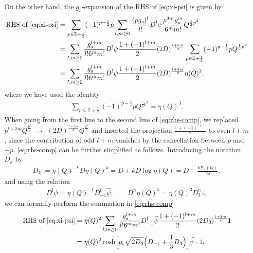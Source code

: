 \documentclass[11pt]{article}
\newcommand{\hf}{\frac{1}{2}}
\def\h#1{\widehat{#1}}
\def\rt#1{\sqrt{#1}}
\renewcommand{\[}{\begin{eqnarray}}
\renewcommand{\]}{\end{eqnarray}}
\begin{document}
On the other hand, the $g_s$-expansion of the RHS of \eqref{eq:xi-psi}
is given by
\begin{align}
 \begin{aligned}
 \text{RHS~of~}\eqref{eq:xi-psi}&=\sum_{p\in\mathbb{Z}+\hf}(-1)^{p-\hf}p
\sum_{l,m\geq0} \frac{(pg_s)^l}{l!}
D^l\psi\frac{p^{3m}g_s^m}{6^m m!}Q^{\hf p^2}\\
&=\sum_{l,m\geq0} \frac{g_s^{l+m}}{l!6^mm!}
D^l\psi\frac{1+(-1)^{l+m}}{2}(2D)^{\frac{l+3m}{2}}\sum_{p\in\mathbb{Z}+\hf}(-1)^{p-\hf}pQ^{\hf p^2}\\
&=\sum_{l,m\geq0} \frac{g_s^{l+m}}{l!6^mm!}
D^l\psi\frac{1+(-1)^{l+m}}{2}(2D)^{\frac{l+3m}{2}}\eta(Q)^3,
 \end{aligned}
\label{eq:rhs-comp}
\end{align}
where we have used the identity
\begin{equation}
\begin{aligned}
 \sum_{p\in\mathbb{Z}+\hf}(-1)^{p-\hf}pQ^{\hf p^2}=\eta(Q)^3.
\end{aligned} 
\end{equation}
When going from the first line to the second line of \eqref{eq:rhs-comp}, 
we replaced
$p^{l+3m}Q^{\frac{p^2}{2}}$
$\to$
\linebreak
$(2D)^{\frac{l+3m}{2}}Q^{\frac{p^2}{2}}$
and inserted the projection $\frac{1+(-1)^{l+m}}{2}$ to even $l+m$, 
since the contribution of odd $l+m$ vanishes
by the cancellation between $p$ and $-p$.
\eqref{eq:rhs-comp} can be further simplified as follows.
Introducing the notation $D_k$ by
\begin{align}
 D_{k}:=\eta(Q)^{-k}D\eta(Q)^k=D+kD\log\eta(Q)=D+\frac{kE_2(Q)}{24},
\label{eq:Dk}
\end{align}
and using the relation 
\begin{equation}
\begin{aligned}
 D^l\psi=\eta(Q)^{-1}D_{-1}^l\h{\psi},\qquad
D^n\eta(Q)^3=\eta(Q)^3D_3^n1,
\end{aligned} 
\end{equation}
we can formally perform the summation in \eqref{eq:rhs-comp}
\begin{align}
 \begin{aligned}
  \text{RHS~of~}\eqref{eq:xi-psi}&=\eta(Q)^2\sum_{l,m\geq0} \frac{g_s^{l+m}}{l!6^mm!}
D_{-1}^l\h{\psi}\frac{1+(-1)^{l+m}}{2}(2D_{3})^{\frac{l+3m}{2}}1\\
&=\eta(Q)^2\cosh\Bigl[g_s\rt{2D_{3}}\Bigl(D_{-1}+\frac{1}{3}D_{3}\Bigr)\Bigr]\h{\psi}\cdot 1.
\label{eq:rhs-op}
 \end{aligned}
\end{align}
\end{document}

